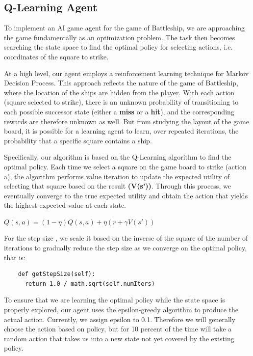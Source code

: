 \documentclass{article}
\begin{document}
\begin{multicols}{2}
\subsection{Q-Learning Agent}
To implement an AI game agent for the game of Battleship, we are approaching the game fundamentally as an optimization problem. The task then becomes searching the state space to find the optimal policy for selecting actions, i.e. coordinates of the square to strike.

At a high level, our agent employs a reinforcement learning technique for Markov Decision Process. This approach reflects the nature of the game of Battleship, where the location of the ships are hidden from the player. With each action (square selected to strike), there is an unknown probability of transitioning to each possible successor state (either a \textbf{miss} or a \textbf{hit}), and the corresponding rewards are therefore unknown as well. But from studying the layout of the game board, it is possible for a learning agent to learn, over repeated iterations, the probability that a specific square contains a ship. 

Specifically, our algorithm is based on the Q-Learning algorithm to find the optimal policy. Each time we select a square on the game board to strike (action a), the algorithm performs value iteration to update the expected utility of selecting that square based on the result \textbf{(V(s’))}. Through this process, we eventually converge to the true expected utility and obtain the action that yields the highest expected value at each state. 
\begin{center}
$Q(s,a)=(1-\eta)Q(s,a)+\eta(r+\gamma V(s'))$

For the step size  , we scale it based on the inverse of the square of the number of iterations to gradually reduce the step size as we converge on the optimal policy, that is: 
\end{center}

\begin{footnotesize}
\begin{verbatim}
 	def getStepSize(self):
      return 1.0 / math.sqrt(self.numIters)

\end{verbatim}
\end{footnotesize}

To ensure that we are learning the optimal policy while the state space is properly explored, our agent uses the epsilon-greedy algorithm to produce the actual action. Currently, we assign epsilon to 0.1. Therefore we will generally choose the action based on policy, but for 10 percent of the time will take a random action that takes us into a new state not yet covered by the existing policy.


\end{multicols}
\end{document}

